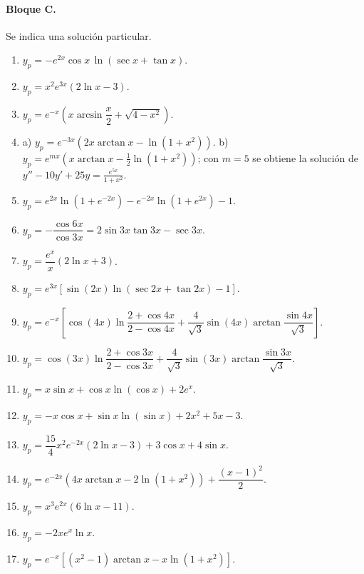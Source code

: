 {\paragraph{Bloque C.} Se indica una soluci\'on particular.
\begin{enumerate}[label=\textbf{C\arabic*.}, leftmargin=*]
    \item $y_p=-e^{2x}\cos x\,\ln\left(\sec x+\tan x\right)$.
    \item $y_p=x^2e^{3x}\left(2\ln x-3\right)$.
    \item $y_p=e^{-x}\left(x\arcsin\dfrac{x}{2}+\sqrt{4-x^2}\right)$.
    \item a) $y_p=e^{-3x}\left(2x\arctan x-\ln\left(1+x^2\right)\right)$. \quad b) $y_p=e^{mx}\left(x\arctan x-\frac12\ln\left(1+x^2\right)\right)$; con $m=5$ se obtiene la soluci\'on de $y''-10y'+25y=\frac{e^{5x}}{1+x^2}$.
    \item $y_p=e^{2x}\ln\left(1+e^{-2x}\right)-e^{-2x}\ln\left(1+e^{2x}\right)-1$.
    \item $y_p=-\dfrac{\cos 6x}{\cos 3x}=2\sin3x\tan3x-\sec3x$.
    \item $y_p=\dfrac{e^x}{x}\left(2\ln x+3\right)$.
    \item $y_p=e^{3x}\left[\sin(2x)\ln\left(\sec2x+\tan2x\right)-1\right]$.
    \item $y_p=e^{-x}\left[\cos(4x)\ln\dfrac{2+\cos4x}{2-\cos4x}+\dfrac{4}{\sqrt3}\sin(4x)\arctan\dfrac{\sin4x}{\sqrt3}\right]$.
    \item $y_p=\cos(3x)\ln\dfrac{2+\cos3x}{2-\cos3x}+\dfrac{4}{\sqrt3}\sin(3x)\arctan\dfrac{\sin3x}{\sqrt3}$.
    \item $y_p=x\sin x+\cos x\ln(\cos x)+2e^x$.
    \item $y_p=-x\cos x+\sin x\ln(\sin x)+2x^2+5x-3$.
    \item $y_p=\dfrac{15}{4}x^2e^{-2x}\left(2\ln x-3\right)+3\cos x+4\sin x$.
    \item $y_p=e^{-2x}\left(4x\arctan x-2\ln\left(1+x^2\right)\right)+\dfrac{(x-1)^2}{2}$.
    \item $y_p=x^3e^{2x}\left(6\ln x-11\right)$.
    \item $y_p=-2xe^x\ln x$.
    \item $y_p=e^{-x}\left[\left(x^2-1\right)\arctan x-x\ln\left(1+x^2\right)\right]$.
\end{enumerate}

}
